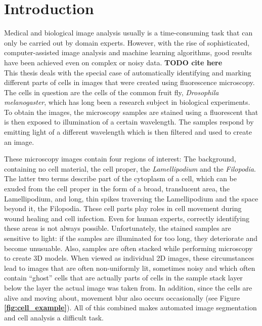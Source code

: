 \chapter{Introduction}
Medical and biological image analysis usually is a time-consuming task that can only be carried out by domain experts. However, with the rise of sophisticated, computer-assisted image analysis and machine learning algorithms, good results have been achieved even on complex or noisy data. \textbf {TODO cite here}\\

\noindent This thesis deals with the special case of automatically identifying and marking different parts of cells in images that were created using fluorescence microscopy. The cells in question are the cells of the common fruit fly, \textit{Drosophila melanogaster}, which has long been a research subject in biological experiments. To obtain the images, the microscopy samples are stained using a fluorescent that is then exposed to illumination of a certain wavelength. The samples respond by emitting light of a different wavelength which is then filtered and used to create an image.

These microscopy images contain four regions of interest: The background, containing no cell material, the cell proper, the \textit{Lamellipodium} and the \textit{Filopodia}. The latter two terms describe part of the cytoplasm of a cell, which can be exuded from the cell proper in the form of a broad, translucent area, the Lamellipodium, and long, thin spikes traversing the Lamellipodium and the space beyond it, the Filopodia. These cell parts play roles in cell movement during wound healing and cell infection. Even for human experts, correctly identifying these areas is not always possible. Unfortunately, the stained samples are sensitive to light: if the samples are illuminated for too long, they deteriorate and become unusuable. Also, samples are often stacked while performing microscopy to create 3D models. When viewed as individual 2D images, these circumstances lead to images that are often non-uniformly lit, sometimes noisy and which often contain ``ghost'' cells that are actually parts of cells in the sample stack layer below the layer the actual image was taken from. In addition, since the cells are alive and moving about, movement blur also occurs occasionally (see Figure \textbf{\ref{fig:cell_example}}). All of this combined makes automated image segmentation and cell analysis a difficult task.\\

